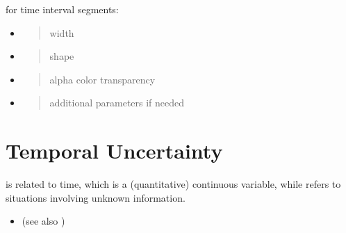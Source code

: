 \documentclass[a4paper,12pt,english]{sphinxhowto}
\begin{document}

for time interval segments:
\begin{itemize}
\item {} 
\begin{quote}

width
\end{quote}

\item {} 
\begin{quote}

shape
\end{quote}

\item {} 
\begin{quote}

alpha color transparency
\end{quote}

\item {} 
\begin{quote}

additional parameters if needed
\end{quote}

\end{itemize}

\begin{quote}




{\hyperref[\detokenize{Uncertainty:cprex}]{}}


\end{quote}



\section{Temporal Uncertainty}
\label{\detokenize{Uncertainty:temporal-uncertainty}}\label{\detokenize{Uncertainty:uncertainty}}\label{\detokenize{Uncertainty::doc}}
 is related to time, which is a (quantitative) continuous variable, while
 refers to situations involving unknown information.
\begin{itemize}
\item {} 
(see also {\hyperref[\detokenize{Time:time}]{}})

\end{itemize}
\end{document}

